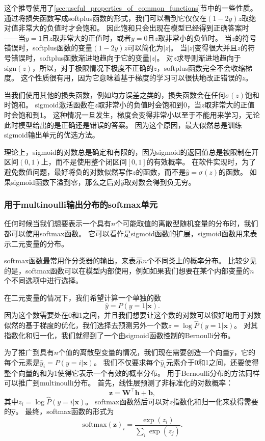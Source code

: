这个推导使用了\ref{sec:useful_properties_of_common_functions}节中的一些性质。
通过将损失函数写成softplus函数的形式，我们可以看到它仅仅在$(1-2y)z$取绝对值非常大的负值时才会饱和。
因此饱和只会出现在模型已经得到正确答案时——当$y=1$且$z$取非常大的正值时，或者$y=0$且$z$取非常小的负值时。
当$z$的符号错误时，softplus函数的变量$(1-2y)z$可以简化为$|z|$。
当$|z|$变得很大并且$z$的符号错误时，softplus函数渐进地趋向于它的变量$|z|$。
对$z$求导则渐进地趋向于$\text{sign}(z)$，所以，对于极限情况下极度不正确的$z$，softplus函数完全不会收缩梯度。
这个性质很有用，因为它意味着基于梯度的学习可以很快地改正错误的$z$。

当我们使用其他的损失函数，例如均方误差之类的，损失函数会在任何$\sigma(z)$饱和时饱和。
sigmoid激活函数在$z$取非常小的负值时会饱和到0，当$z$取非常大的正值时会饱和到1。
这种情况一旦发生，梯度会变得非常小以至于不能用来学习，无论此时模型给出的是正确还是错误的答案。
因为这个原因，最大似然总是训练sigmoid输出单元的优选方法。

理论上，sigmoid的对数总是确定和有限的，因为sigmoid的返回值总是被限制在开区间$(0, 1)$上，而不是使用整个闭区间$[0, 1]$的有效概率。
在软件实现时，为了避免数值问题，最好将负的对数似然写作$z$的函数，而不是$\hat{y}=\sigma(z)$的函数。
如果sigmoid函数下溢到零，那么之后对$\hat{y}$取对数会得到负无穷。

\subsubsection{用于multinoulli输出分布的softmax单元}
\label{sec:softmax_units_for_multinoulli_output_distributions}

任何时候当我们想要表示一个具有$n$个可能取值的离散型随机变量的分布时，我们都可以使用softmax函数。
它可以看作是sigmoid函数的扩展，sigmoid函数用来表示二元变量的分布。


softmax函数最常用作分类器的输出，来表示$n$个不同类上的概率分布。
比较少见的是，softmax函数可以在模型内部使用，例如如果我们想要在某个内部变量的$n$个不同选项中进行选择。

在二元变量的情况下，我们希望计算一个单独的数
\begin{equation}
\hat{y} = P(y=1|\bm{x}).
\end{equation}
因为这个数需要处在0和1之间，并且我们想要让这个数的对数可以很好地用于对数似然的基于梯度的优化，我们选择去预测另外一个数$z=\log \hat{P}(y=1|\bm{x})$。
对其指数化和归一化，我们就得到了一个由sigmoid函数控制的Bernoulli分布。

为了推广到具有$n$个值的离散型变量的情况，我们现在需要创造一个向量$\hat{\bm{y}}$，它的每个元素是$\hat{y}_i = P(y=i|\bm{x})$。
我们不仅要求每个$\hat{y}_i$元素介于0和1之间，还要使得整个向量的和为1使得它表示一个有效的概率分布。
用于Bernoulli分布的方法同样可以推广到multinoulli分布。
首先，线性层预测了非标准化的对数概率：
\begin{equation}
\bm{z} = \bm{W}^\top \bm{h}+\bm{b},
\end{equation}
其中$z_i=\log \hat{P}(y=i|\bm{x})$。
softmax函数然后可以对$z$指数化和归一化来获得需要的$\hat{\bm{y}}$。
最终，softmax函数的形式为
\begin{equation}
\text{softmax}(\bm{z})_i = \frac{\exp(z_i)}{\sum_i \exp(z_j)}.
\end{equation}

